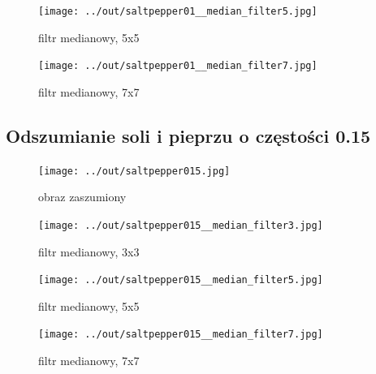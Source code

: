 \documentclass[a4paper,12pt]{article}
\begin{document}
\begin{figure}[h!]
\begin{minipage}[t]{7.5cm}
\begin{center}
\texttt{[image: ../out/saltpepper01\_\_median\_filter5.jpg]}
\caption{filtr medianowy, 5x5}
\end{center}
\end{minipage}
\hfill
\begin{minipage}[t]{7.5cm}
\begin{center}
\texttt{[image: ../out/saltpepper01\_\_median\_filter7.jpg]}
\caption{filtr medianowy, 7x7}
\end{center}
\end{minipage}
\end{figure}


\newpage
\subsection{Odszumianie soli i pieprzu o częstości 0.15}
\begin{figure}[h!]
\begin{minipage}[t]{7.5cm}
\begin{center}
\texttt{[image: ../out/saltpepper015.jpg]}
\caption{obraz zaszumiony}
\end{center}
\end{minipage}
\hfill
\begin{minipage}[t]{7.5cm}
\begin{center}
\texttt{[image: ../out/saltpepper015\_\_median\_filter3.jpg]}
\caption{filtr medianowy, 3x3}
\end{center}
\end{minipage}
\end{figure}

\begin{figure}[h!]
\begin{minipage}[t]{7.5cm}
\begin{center}
\texttt{[image: ../out/saltpepper015\_\_median\_filter5.jpg]}
\caption{filtr medianowy, 5x5}
\end{center}
\end{minipage}
\hfill
\begin{minipage}[t]{7.5cm}
\begin{center}
\texttt{[image: ../out/saltpepper015\_\_median\_filter7.jpg]}
\caption{filtr medianowy, 7x7}
\end{center}
\end{minipage}
\end{figure}
\end{document}
